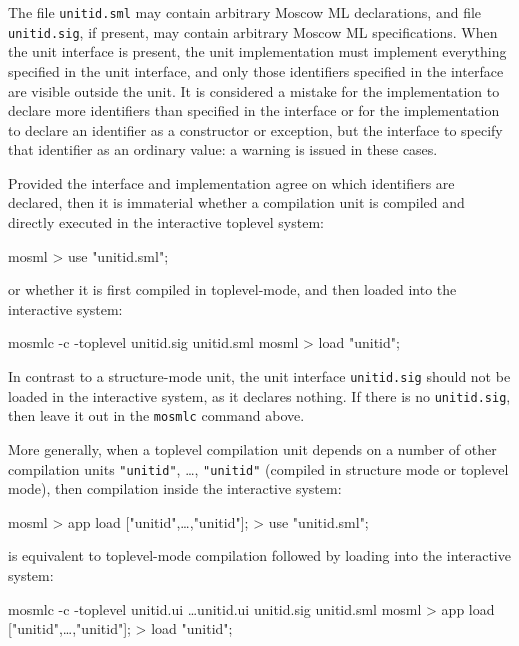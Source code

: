 \documentclass[fleqn,a4paper]{article}
\begin{document}
The file \texttt{unitid.sml} may contain arbitrary Moscow ML
declarations, and file \texttt{unitid.sig}, if present, may contain
arbitrary Moscow ML specifications.  When the unit interface is
present, the unit implementation must implement everything specified
in the unit interface, and only those identifiers specified in the
interface are visible outside the unit.  It is considered a
mistake for the implementation to declare more identifiers
than specified in the interface or
for the implementation to
declare an identifier as a constructor or exception, but the interface
to specify that identifier as an ordinary value:
a warning is issued in these cases. 
 
Provided the interface and implementation agree on which identifiers
are declared, then it is immaterial whether a compilation unit is
compiled and directly executed in the interactive toplevel system:

\begin{program}
mosml
> use "unitid.sml";
\end{program}

\noindent 
or whether it is first compiled in toplevel-mode, and then loaded into
the interactive system:

\begin{program}
mosmlc -c -toplevel unitid.sig unitid.sml 
mosml
> load "unitid";
\end{program}

\noindent In contrast to a structure-mode unit, the
unit interface \texttt{unitid.sig} should not be loaded in the
interactive system, as it declares nothing.  If there is no
\texttt{unitid.sig}, then leave it out in the \texttt{mosmlc} command
above.

More generally, when a toplevel compilation unit depends on a number
of other compilation units \texttt{"unitid\et"}, \ldots,
\texttt{"unitid\n"} (compiled in structure mode or toplevel mode),
then compilation inside the interactive system:

\begin{program}
mosml
> app load ["unitid\et",\ldots,"unitid\n"];
> use "unitid.sml";
\end{program}

\noindent is equivalent to toplevel-mode compilation followed by
loading into the interactive system:

\begin{program}
mosmlc -c -toplevel unitid\et.ui \ldots unitid\n.ui unitid.sig unitid.sml 
mosml
> app load ["unitid\et",\ldots,"unitid\n"];
> load "unitid";
\end{program}
\end{document}
